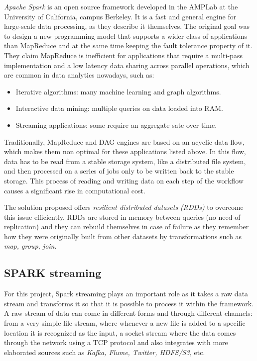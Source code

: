 \documentclass{llncs}
\begin{document}
\textit{Apache Spark} is an open source framework developed in the AMPLab at the University of California, campus Berkeley\cite{SparkResearch}. It is a fast and general engine for large-scale data processing, as they describe it themselves. The original goal was to design a new programming model that supports a wider class of applications than MapReduce and at the same time keeping the fault tolerance property of it. They claim MapReduce is inefficient for applications that require a multi-pass implementation and a low latency data sharing across parallel operations, which are common in data analytics nowadays, such as: 

\begin{itemize}
 \item Iterative algorithms: many machine learning and graph algorithms.
 \item Interactive data mining: multiple queries on data loaded into RAM.
 \item Streaming applications: some require an aggregate sate over time.
\end{itemize}

Traditionally, MapReduce and DAG engines are based on an acyclic data flow, which makes them non optimal for these applications listed above. In this flow, data has to be read from a stable storage system, like a distributed file system, and then processed on a series of jobs only to be written back to the stable storage. This process of reading and writing data on each step of the workflow causes a significant rise in computational cost.

The solution proposed offers \textit{resilient distributed datasets (RDDs)} to overcome this issue efficiently. RDDs are stored in memory between queries (no need of replication) and they can rebuild themselves in case of failure as they remember how they were originally built from other datasets by transformations such as \textit{map, group, join}.

\subsection{SPARK streaming}

For this project, Spark streaming plays an important role as it takes a raw data stream and transforms it so that it is possible to process it within the framework. A raw stream of data can come in different forms and through different channels: from a very simple file stream, where whenever a new file is added to a specific location it is recognized as the input, a socket stream where the data comes through the network using a TCP protocol and also integrates with more elaborated sources such as \textit{Kafka, Flume, Twitter, HDFS/S3,} etc.
\end{document}
